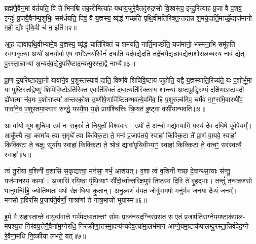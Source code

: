 ब्रह्म॑णै॒वैन॒मा व॑र्तयति॒ वि ते॑ भिनद्मि तक॒रीमित्या॑ह यथाय॒जुरे॒वैतदु॑रुद्र॒प्सो वि॒श्वरू॑प॒ इन्दु॒रित्या॑ह प्र॒जा वै प॒शव॒ इन्दुः॑ प्र॒जयै॒वैन॑म्प॒शुभिः॒ सम॑र्धयति॒ दिवं॒ वै य॒ज्ञस्य॒ व्यृ॑द्धं गच्छति पृथि॒वीमति॑रिक्त॒न्तद्यन्न श॒मये॒दार्ति॒मार्च्छे॒द्यज॑मानो म॒ही द्यौः पृ॑थि॒वी च॑ न॒ इति॑॥२॥

आ॒ह॒ द्यावा॑पृथि॒वीभ्या॑मे॒व य॒ज्ञस्य॒ व्यृ॑द्धं॒ चाति॑रिक्तं च शमयति॒ नार्ति॒मार्च्छ॑ति॒ यज॑मानो॒ भस्म॑ना॒भि समू॑हति स्व॒गाकृ॑त्या॒ अथो॑ अ॒नयो॒र्वा ए॒ष गर्भो॒\-ऽनयो॑रे॒वैनं॑ दधाति॒ यद॑व॒द्येदति॒ तद्रे॑चये॒द्यन्नाव॒द्येत्प॒शोराल॑ब्धस्य॒ नाव॑ द्येत् पु॒रस्ता॒न्नाभ्या॑ अ॒न्यद॑व॒द्येदु॒परि॑ष्टाद॒न्यत्पु॒रस्ता॒द्वै नाभ्यै᳚॥३॥

प्रा॒ण उ॒परि॑ष्टादपा॒नो यावा॑ने॒व प॒शुस्तस्याव॑ द्यति॒ विष्ण॑वे शिपिवि॒ष्टाय॑ जुहोति॒ यद्वै य॒ज्ञस्या॑ति॒रिच्य॑ते॒ यः प॒शोर्भू॒मा या पुष्टि॒स्तद्विष्णुः॑ शिपिवि॒ष्टो\-ऽति॑रिक्त ए॒वाति॑रिक्तं दधा॒त्यति॑रिक्तस्य॒ शान्त्या॑ अ॒ष्टाप्रू॒ड्ढिर॑ण्यं॒ दक्षि॑णा॒\-ऽष्टाप॑दी॒ ह्ये॑षात्मा न॑व॒मः प॒शोराप्त्या॑ अन्तरको॒श उ॒ष्णीषे॒णावि॑ष्टितम्भवत्ये॒वमि॑व॒ हि प॒शुरुल्ब॑मिव॒ चर्मे॑व मा॒ꣳ॒समि॒वास्थी॑व॒ यावा॑ने॒व प॒शुस्तमा॒प्त्वाव॑ रुन्द्धे॒ यस्यै॒षा य॒ज्ञे प्राय॑श्चित्तिः क्रि॒यत॑ इ॒ष्ट्वा वसी॑यान्भवति॥४॥

{\anuvakamend[{व॒र्त॒येत्या॑ह न॒ इति॒ वै नाभ्या॒ उल्ब॑मि॒वैक॑विꣳशतिश्च॥१॥}]}

आ वा॑यो भूष शुचिपा॒ उप॑ नः स॒हस्रं॑ ते नि॒युतो॑ विश्ववार। उपो॑ ते॒ अन्धो॒ मद्य॑मयामि॒ यस्य॑ देव दधि॒षे पू᳚र्व॒पेयम्᳚। आकू᳚त्यै त्वा॒ कामा॑य त्वा स॒मृधे᳚ त्वा किक्कि॒टा ते॒ मनः॑ प्र॒जाप॑तये॒ स्वाहा॑ किक्कि॒टा ते᳚ प्रा॒णं वा॒यवे॒ स्वाहा॑ किक्कि॒टा ते॒ चक्षुः॒ सूर्या॑य॒ स्वाहा॑ किक्कि॒टा ते॒ श्रोत्रं॒ द्यावा॑पृथि॒वीभ्या॒ꣳ॒ स्वाहा॑ किक्कि॒टा ते॒ वाच॒ꣳ॒ सर॑स्वत्यै॒ स्वाहा᳚॥५॥

त्वं तु॒रीया॑ व॒शिनी॑ व॒शासि॑ स॒कृद्यत्त्वा॒ मन॑सा॒ गर्भ॒ आश॑यत्। व॒शा त्वं व॒शिनी॑ गच्छ दे॒वान्थ्स॒त्याः स॑न्तु॒ यज॑मानस्य॒ कामाः᳚। अ॒जासि॑ रयि॒ष्ठा पृ॑थि॒व्याꣳ सी॑दो॒र्ध्वान्तरि॑क्ष॒मुप॑ तिष्ठस्व दि॒वि ते॑ बृ॒हद्भाः। तन्तुं॑ त॒न्वन्रज॑सो भा॒नुमन्वि॑हि॒ ज्योति॑ष्मतः प॒थो र॑क्ष धि॒या कृ॒तान्। अ॒नु॒ल्ब॒णं व॑यत॒ जोगु॑वा॒मपो॒ मनु॑र्भव ज॒नया॒ दैव्यं॒ जनम्᳚। मन॑सो ह॒विर॑सि प्र॒जाप॑ते॒र्वर्णो॒ गात्रा॑णां ते गात्र॒भाजो॑ भूयास्म॥६॥

{\anuvakamend[{सर॑स्वत्यै॒ स्वाहा॒ मनु॒स्त्रयो॑दश च॥२॥}]}

इ॒मे वै स॒हास्ता॒न्ते वा॒युर्व्य॑वा॒त्ते गर्भ॑मदधाता॒न्तꣳ सोमः॒ प्राज॑नयद॒ग्निर॑ग्रसत॒ स ए॒तं प्र॒जाप॑तिराग्ने॒यम॒ष्टाक॑पाल- मपश्य॒त्तं निर॑वप॒त्तेनै॒वैना॑म॒ग्नेरधि॒ निर॑क्रीणा॒त्तस्मा॒दप्य॑न्यदेव॒त्या॑मा॒लभ॑मान आग्ने॒यम॒ष्टाक॑पालम्पु॒रस्ता॒न्निर्व॑पेद॒ग्ने- रे॒वैना॒मधि॑ नि॒ष्क्रीया ल॑भते॒ यत्॥७॥

